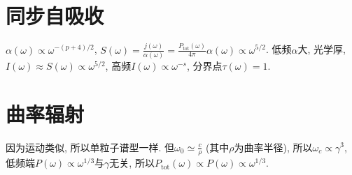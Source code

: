\section{同步自吸收}

$\alpha(\omega)\propto\omega^{-(p+4)/2}$, $S(\omega)=\frac{j(\omega)}{\alpha(\omega)}=\frac{P_\text{tot}(\omega)}{4\pi}\alpha(\omega)\propto\omega^{5/2}$. 低频$\alpha$大, 光学厚, $I(\omega)\approx S(\omega)\propto\omega^{5/2}$, 高频$I(\omega)\propto\omega^{-s}$, 分界点$\tau(\omega)=1$.

\section{曲率辐射}

因为运动类似, 所以单粒子谱型一样. 但$\omega_0\simeq\frac{c}{\rho}$ (其中$\rho$为曲率半径), 所以$\omega_c\propto\gamma^3$, 低频端$P(\omega)\propto\omega^{1/3}$与$\gamma$无关, 所以$P_\text{tot}(\omega)\propto P(\omega)\propto\omega^{1/3}$.
